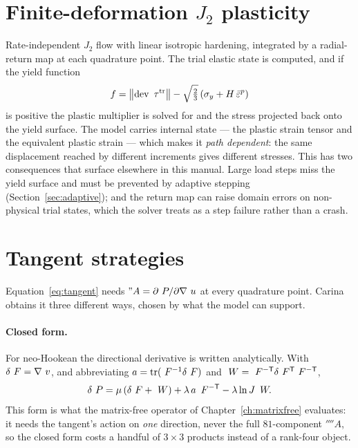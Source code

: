 \section{Finite-deformation \texorpdfstring{$J_2$}{J2} plasticity}

Rate-independent $J_2$ flow with linear isotropic hardening, integrated by a
radial-return map at each quadrature point.  The trial elastic state is
computed, and if the yield function
\begin{equation}
  f = \left\lVert \operatorname{dev} ~\tau^{\mathrm{tr}} \right\rVert - \sqrt{\tfrac23}\left(\sigma_y + H\,\bar{\varepsilon}^p\right)
\end{equation}
is positive the plastic multiplier is solved for and the stress projected back
onto the yield surface.  The model carries internal state --- the plastic
strain tensor and the equivalent plastic strain --- which makes it
\emph{path dependent}: the same displacement reached by different increments
gives different stresses.  This has two consequences that surface elsewhere in
this manual.  Large load steps miss the yield surface and must be prevented by
adaptive stepping (Section~\ref{sec:adaptive}); and the return map can raise
domain errors on non-physical trial states, which the solver treats as a step
failure rather than a crash.

\section{Tangent strategies}
\label{sec:tangent-strategies}

Equation~\eqref{eq:tangent} needs $"A = \partial~P/\partial
\nabla~u$ at every quadrature point.  Carina obtains it three different ways,
chosen by what the model can support.

\paragraph{Closed form.}  For neo-Hookean the directional derivative is
written analytically.  With $\delta~F = \nabla~v$, and abbreviating
$a = \operatorname{tr}(~F^{-1}\delta~F)$ and $~W =
~F^{-\mathsf{T}}\delta~F^{\mathsf{T}}~F^{-\mathsf{T}}$,
\begin{equation}
  \delta~P = \mu\left(\delta~F + ~W\right)
               + \lambda\, a\, ~F^{-\mathsf{T}}
               - \lambda \ln J\, ~W .
  \label{eq:nh-action}
\end{equation}
This form is what the matrix-free operator of Chapter~\ref{ch:matrixfree}
evaluates: it needs the tangent's action on \emph{one} direction, never the
full $81$-component $\fourth{A}$, so the closed form costs a handful of
$3\times3$ products instead of a rank-four object.

